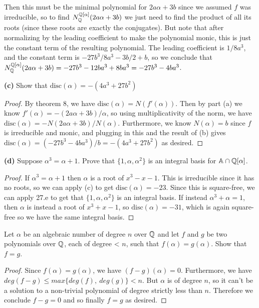 \documentclass[11pt]{article}
\newcommand{\disc}{\text{disc}}
\begin{document}
  Then this must be the minimal polynomial for $2a\alpha+3b$ since we assumed $f$ was irreducible, so to find $N_{\mathbb{Q}}^{\mathbb{Q}[\alpha]}(2a\alpha+3b)$ we just need to find the product of all its roots (since these roots are exactly the conjugates).
  But note that after normalizing by the leading coefficient to make the polynomial monic, this is just the constant term of the resulting polynomial.
  The leading coefficient is $1/8a^3$, and the constant term is $-27b^3/8a^3-3b/2+b$, so we conclude that $N_{\mathbb{Q}}^{\mathbb{Q}[\alpha]}(2a\alpha+3b) = -27b^3-12ba^3 + 8ba^3 = -27b^3-4ba^3$.

\textbf{(c)} Show that $\disc(\alpha) = -(4a^3+27b^2)$

\begin{proof}
  By theorem 8, we have $\disc(\alpha) = N(f'(\alpha))$.
  Then by part (a) we know $f'(\alpha) = -(2a\alpha + 3b)/\alpha$, so using multiplicativity of the norm, we have $\disc(\alpha) = -N(2a\alpha + 3b)/N(\alpha)$.
  Furthermore, we know $N(\alpha) = b$ since $f$ is irreducible and monic, and plugging in this and the result of (b) gives $\disc(\alpha) = (-27b^3-4ba^3)/b = -(4a^3 + 27b^2)$ as desired.
\end{proof}

\textbf{(d)} Suppose $\alpha^3 = \alpha + 1$. Prove that $\{1,\alpha,\alpha^2\}$ is an integral basis for $\mathbb{A} \cap \mathbb{Q}[\alpha]$.

\begin{proof}
  If $\alpha^3 = \alpha + 1$ then $\alpha$ is a root of $x^3 - x - 1$. This is irreducible since it has no roots, so we can apply (c) to get $\disc(\alpha) = -23$.
  Since this is square-free, we can apply 27.e to get that $\{1,\alpha,\alpha^2\}$ is an integral basis.
  If instead $\alpha^3 + \alpha = 1$, then $\alpha$ is instead a root of $x^3 + x - 1$, so $\disc(\alpha) = -31$, which is again square-free so we have the same integral basis.
\end{proof}


Let $\alpha$ be an algebraic number of degree $n$ over $\mathbb{Q}$ and let $f$ and $g$ be two polynomials over $\mathbb{Q}$, each of degree < $n$, such that $f(\alpha) = g(\alpha)$. Show that $f = g$.

\begin{proof}
  Since $f(\alpha) = g(\alpha)$, we have $(f - g)(\alpha) = 0$.
  Furthermore, we have $deg(f-g) \le max\{deg(f),\ deg(g)\} < n$.
  But $\alpha$ is of degree $n$, so it can't be a solution to a non-trivial polynomial of degree strictly less than $n$.
  Therefore we conclude $f - g = 0$ and so finally $f = g$ as desired.
\end{proof}
\end{document}
